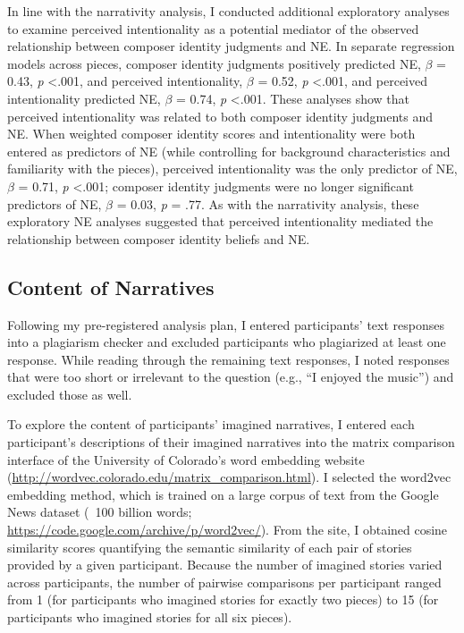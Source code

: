 \documentclass[12pt,twoside]{reedthesis}
\begin{document}
In line with the narrativity analysis, I conducted additional exploratory analyses to examine perceived intentionality as a potential mediator of the observed relationship between composer identity judgments and NE. In separate regression models across pieces, composer identity judgments positively predicted NE, $\beta$ = 0.43, \emph{p} \textless .001, and perceived intentionality, $\beta$ = 0.52, \emph{p} \textless .001, and perceived intentionality predicted NE, $\beta$ = 0.74, \emph{p} \textless .001. These analyses show that perceived intentionality was related to both composer identity judgments and NE. When weighted composer identity scores and intentionality were both entered as predictors of NE (while controlling for background characteristics and familiarity with the pieces), perceived intentionality was the only predictor of NE, $\beta$ = 0.71, \emph{p} \textless .001; composer identity judgments were no longer significant predictors of NE, $\beta$ = 0.03, \emph{p} = .77. As with the narrativity analysis, these exploratory NE analyses suggested that perceived intentionality mediated the relationship between composer identity beliefs and NE.


\subsection*{Content of Narratives}

Following my pre-registered analysis plan, I entered participants’ text responses into a plagiarism checker and excluded participants who plagiarized at least one response. While reading through the remaining text responses, I noted responses that were too short or irrelevant to the question (e.g., “I enjoyed the music”) and excluded those as well.

To explore the content of participants’ imagined narratives, I entered each participant’s descriptions of their imagined narratives into the matrix comparison interface of the University of Colorado’s word embedding website (\url{http://wordvec.colorado.edu/matrix_comparison.html}). I selected the word2vec embedding method, which is trained on a large corpus of text from the Google News dataset (~100 billion words; \url{https://code.google.com/archive/p/word2vec/}). From the site, I obtained cosine similarity scores quantifying the semantic similarity of each pair of stories provided by a given participant. Because the number of imagined stories varied across participants, the number of pairwise comparisons per participant ranged from 1 (for participants who imagined stories for exactly two pieces) to 15 (for participants who imagined stories for all six pieces).
\end{document}
